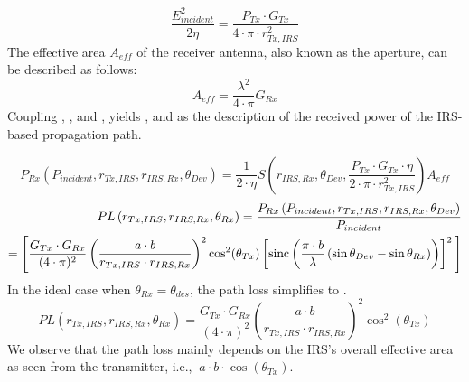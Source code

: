 \begin{equation} \label{Eq:model1 E and P }
	\frac{E_{incident}^2}{2 \eta} = \frac{P_{Tx} \cdot G_{Tx}}{4 \cdot \pi \cdot r_{Tx,IRS}^2}     
\end{equation}
The effective area $A_{eff} $ of the receiver antenna, also known as the aperture, can be described as follows:
\begin{equation}\label{Aeff}
	A_{eff} = \frac{\lambda^2}{4 \cdot \pi} G_{Rx}
\end{equation}
Coupling , , and , yields , and  as the description of the received power of the IRS-based propagation path. 

\begin{equation} \label{Eq:model1 power received}
	P_{Rx} \left( P_{incident}, r_{Tx, IRS},r_{IRS, Rx},\theta_{Dev} \right) = \frac{1}{2 \cdot \eta} S \left( r_{IRS, Rx},\theta_{Dev},\frac{P_{Tx} \cdot G_{Tx} \cdot \eta}{2 \cdot \pi \cdot r_{Tx,IRS}^2} \right) A_{eff}
\end{equation}
\begin{equation} \label{Eq:model1 path loss}
	\begin{split}
		PL \left( r_{Tx, IRS},r_{IRS, Rx},\theta_{Rx} \right) = \frac{P_{Rx} \left( P_{incident}, r_{Tx, IRS},r_{IRS, Rx},\theta_{Dev}\right) }{P_{incident}}\\
		=\Bigg[\frac{G_{Tx} \cdot G_{Rx}}{(4 \cdot \pi)^2} \left( \frac{a \cdot b}{r_{Tx, IRS} \cdot r_{IRS, Rx}} \right)^2 \cos^2 (\theta_{Tx}) \left[ \operatorname{sinc} \left( \frac{\pi \cdot b}{\lambda} \left( \sin\theta_{Dev}-\sin\theta_{Rx} \right) \right) \right]^2\Bigg]
	\end{split}
\end{equation}
In the ideal case when $\theta_{Rx} = \theta_{des} $, the path loss simplifies to .
\begin{equation} \label{Eq:model1 simple path loss}
	PL \left(r_{Tx, IRS}, r_{IRS, Rx}, \theta_{Rx} \right) =\frac{G_{Tx} \cdot G_{Rx}}{(4 \cdot \pi)^2} \left( \frac{a \cdot b}{r_{Tx, IRS}  \cdot r_{IRS, Rx}} \right)^2 \cos^2 (\theta_{Tx}) 
\end{equation}
We observe that the path loss  mainly depends on the IRS's overall effective area as seen from the transmitter, i.e., $\ a \cdot b \cdot \cos(\theta_{Tx})$.
